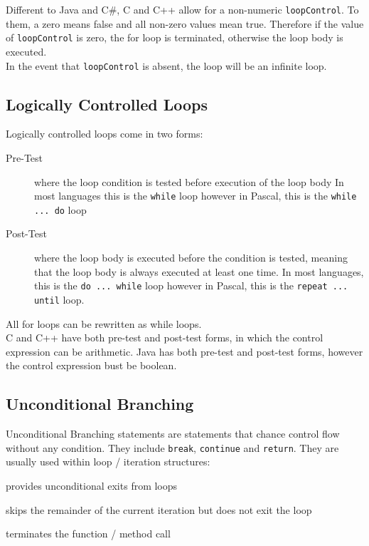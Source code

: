 Different to Java and C\#, C and C++ allow for a non-numeric \verb|loopControl|. To them, a zero means false and all non-zero values mean true. Therefore if the value of \verb|loopControl| is zero, the for loop is terminated, otherwise the loop body is executed.\\

In the event that \verb|loopControl| is absent, the loop will be an infinite loop. 

\subsection{Logically Controlled Loops}
Logically controlled loops come in two forms:
\begin{description}
    \item[Pre-Test] where the loop condition is tested before execution of the loop body In most languages this is the \verb|while| loop however in Pascal, this is the \verb|while ... do| loop
    \item[Post-Test] where the loop body is executed before the condition is tested, meaning that the loop body is always executed at least one time. In most languages, this is the \verb|do ... while| loop however in Pascal, this is the \verb|repeat ... until| loop. 
\end{description}

All for loops can be rewritten as while loops. \\

C and C++ have both pre-test and post-test forms, in which the control expression can be arithmetic. Java has both pre-test and post-test forms, however the control expression bust be boolean. 

\subsection{Unconditional Branching}
Unconditional Branching statements are statements that chance control flow without any condition. They include \verb|break|, \verb|continue| and \verb|return|. They are usually used within loop / iteration structures:
\begin{description}[font=\ttfamily]
    \item[break] provides unconditional exits from loops
    \item[continue] skips the remainder of the current iteration but does not exit the loop
    \item[return] terminates the function / method call 
\end{description}

